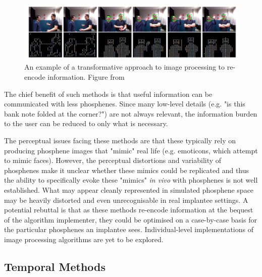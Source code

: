 \documentclass[a4paper,11pt,openany]{book}
\begin{document}
\begin{figure}[htbp]
\centering
\includegraphics[width=.9\linewidth]{./graphics/litreview/transformative.png}
\caption[Example of using a transformative approach to image processing to re-encode information]{\label{fig:orgdf227ab}
An example of a transformative approach to image processing to re-encode information. Figure from \cite{lui_transformative_2012}}
\end{figure}

The chief benefit of such methods is that useful information can be communicated with less phosphenes.
Since many low-level details (e.g. "is this bank note folded at the corner?") are not always relevant, the information burden to the user can be reduced to only what is necessary.

The perceptual issues facing these methods are that these typically rely on producing phosphene images that "mimic" real life (e.g. emoticons, which attempt to mimic faces). \cite{lui_transformative_2012}
However, the perceptual distortions and variability of phosphenes make it unclear whether these mimics could be replicated and thus the ability to specifically evoke these "mimics" \emph{in vivo} with phosphenes is not well established.
What may appear cleanly represented in simulated phosphene space may be heavily distorted and even unrecognisable in real implantee settings.
A potential rebuttal is that as these methods re-encode information at the bequest of the algorithm implementer, they could be optimised on a case-by-case basis for the particular phosphenes an implantee sees.
Individual-level implementations of image processing algorithms are yet to be explored.

\subsection*{Temporal Methods}
\label{sec:org56e3860}
\end{document}
